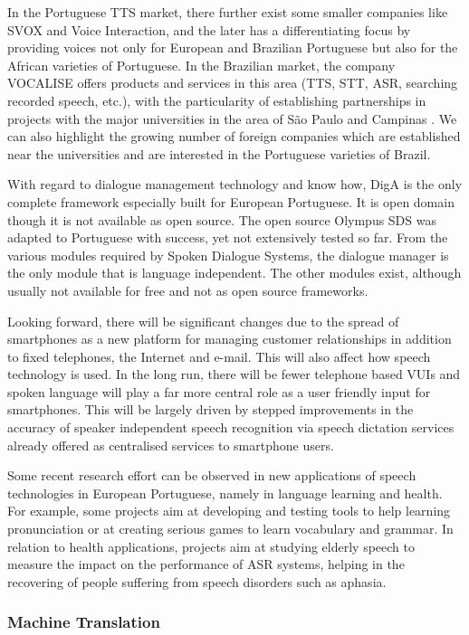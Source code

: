 \begin{multicols}{2}
In the Portuguese TTS market, there further exist some smaller companies like SVOX and Voice Interaction, and the later has a differentiating focus by providing voices not only for European and Brazilian Portuguese but also for the African varieties of Portuguese. In the Brazilian market, the company VOCALISE offers products and services in this area (TTS, STT, ASR, searching recorded speech, etc.), with the particularity of establishing partnerships in projects with the major universities in the area of São Paulo and Campinas \cite{neto}. We can also highlight the growing number of foreign companies which are established near the universities and are interested in the Portuguese varieties of Brazil.

    With regard to dialogue management technology and know how, DigA is the only complete framework especially built for European Portuguese. It is open domain though it is not available as open source. The open source Olympus SDS was adapted to Portuguese with success, yet not extensively tested so far. From the various modules required by Spoken Dialogue Systems, the dialogue manager is the only module that is language independent. The other modules exist, although usually not available for free and not as open source frameworks.

   Looking forward, there will be significant changes due to the spread of smartphones as a new platform for managing customer relationships in addition to fixed telephones, the Internet and e-mail. This will also affect how speech technology is used. In the long run, there will be fewer telephone based VUIs and spoken language will play a far more central role as a user friendly input for smartphones. This will be largely driven by stepped improvements in the accuracy of speaker independent speech recognition via speech dictation services already offered as centralised services to smartphone users. 

Some recent research effort can be observed in new applications of speech technologies in European Portuguese, namely in language learning and health. For example, some projects aim at developing and testing tools to help learning pronunciation or at creating serious games to learn vocabulary and grammar. In relation to health applications, projects aim at studying elderly speech to measure the impact on the performance of ASR systems, helping in the recovering of people suffering from speech disorders such as aphasia.

\subsubsection{Machine Translation}


\end{multicols}
